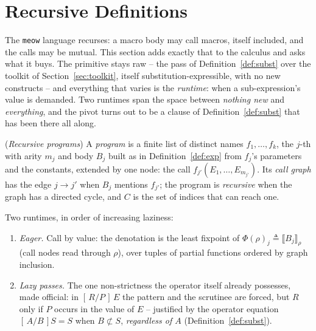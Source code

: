 \documentclass[runningheads,envcountsect]{llncs}
\begin{document}
\section{Recursive Definitions}
\label{sec:recursion}

The \texttt{meow} language recurses: a macro body may call macros, itself included, and the calls may be mutual. This section adds exactly that to the calculus and asks what it buys. The primitive stays raw -- the pass of Definition~\ref{def:subst} over the toolkit of Section~\ref{sec:toolkit}, itself substitution-expressible, with no new constructs -- and everything that varies is the \emph{runtime}: when a sub-expression's value is demanded. Two runtimes span the space between \emph{nothing new} and \emph{everything}, and the pivot turns out to be a clause of Definition~\ref{def:subst} that has been there all along.

\begin{definition}
    (\emph{Recursive programs})
    \label{def:recprog}
    A \emph{program} is a finite list of distinct names $f_1, \dots, f_k$, the $j$-th with arity $m_j$ and body $B_j$ built as in Definition~\ref{def:exp} from $f_j$'s parameters and the constants, extended by one node: the call $f_{j'}(E_1, \dots, E_{m_{j'}})$. Its \emph{call graph} has the edge $j \to j'$ when $B_j$ mentions $f_{j'}$; the program is \emph{recursive} when the graph has a directed cycle, and $C$ is the set of indices that can reach one.
\end{definition}

Two runtimes, in order of increasing laziness:
\begin{enumerate}
    \item \emph{Eager.} Call by value: the denotation is the least fixpoint of $\Phi(\rho)_j \triangleq \llbracket B_j \rrbracket_\rho$ (call nodes read through $\rho$), over tuples of partial functions ordered by graph inclusion.
    \item \emph{Lazy passes.} The one non-strictness the operator itself already possesses, made official: in $[\,R/P\,]\,E$ the pattern and the scrutinee are forced, but $R$ only if $P$ occurs in the value of $E$ -- justified by the operator equation $[\,A/B\,]S = S$ when $B \not\subset S$, \emph{regardless of $A$} (Definition~\ref{def:subst}).
\end{enumerate}
\end{document}
